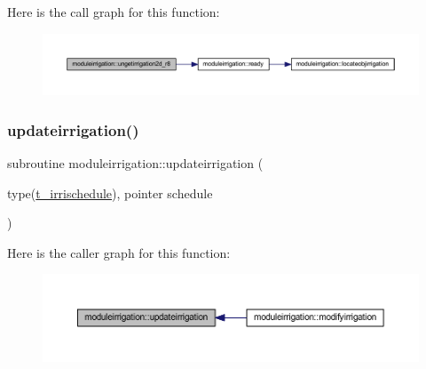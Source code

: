 Here is the call graph for this function\+:\nopagebreak
\begin{figure}[H]
\begin{center}
\leavevmode
\includegraphics[width=350pt]{namespacemoduleirrigation_a05ab21ff0a3d20f186805f3b6d100c9a_cgraph}
\end{center}
\end{figure}
\mbox{\label{namespacemoduleirrigation_a5e72e31f9329f22de3b6ae1142d2371c}} 
\subsubsection{\texorpdfstring{updateirrigation()}{updateirrigation()}}
{\footnotesize\ttfamily subroutine moduleirrigation\+::updateirrigation (\begin{DoxyParamCaption}\item[{type(\mbox{\hyperlink{structmoduleirrigation_1_1t__irrischedule}{t\+\_\+irrischedule}}), pointer}]{schedule }\end{DoxyParamCaption})\hspace{0.3cm}{\ttfamily [private]}}

Here is the caller graph for this function\+:\nopagebreak
\begin{figure}[H]
\begin{center}
\leavevmode
\includegraphics[width=350pt]{namespacemoduleirrigation_a5e72e31f9329f22de3b6ae1142d2371c_icgraph}
\end{center}
\end{figure}
\mbox{\label{namespacemoduleirrigation_af7ed2c0b32e93ac914c21fd4aa075fb6}} 
